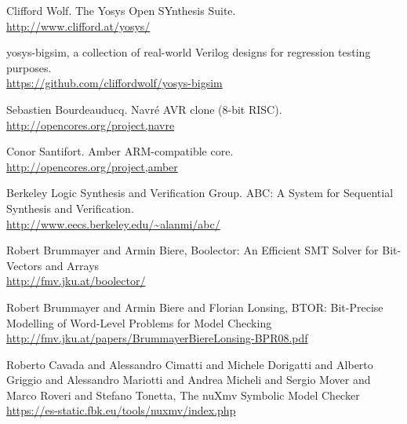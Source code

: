 \documentclass[9pt,technote,a4paper]{IEEEtran}
\begin{document}
\begin{thebibliography}{9}

Clifford Wolf. The Yosys Open SYnthesis Suite. \\
\url{http://www.clifford.at/yosys/}

yosys-bigsim, a collection of real-world Verilog designs for regression testing purposes. \\
\url{https://github.com/cliffordwolf/yosys-bigsim}

Sebastien Bourdeauducq. Navré AVR clone (8-bit RISC). \\
\url{http://opencores.org/project,navre}

Conor Santifort. Amber ARM-compatible core. \\
\url{http://opencores.org/project,amber}

Berkeley Logic Synthesis and Verification Group. ABC: A System for Sequential Synthesis and Verification. \\
\url{http://www.eecs.berkeley.edu/~alanmi/abc/}

Robert Brummayer and Armin Biere, Boolector: An Efficient SMT Solver for Bit-Vectors and Arrays\\
\url{http://fmv.jku.at/boolector/}

Robert Brummayer and Armin Biere and Florian Lonsing, BTOR:
Bit-Precise Modelling of Word-Level Problems for Model Checking\\
\url{http://fmv.jku.at/papers/BrummayerBiereLonsing-BPR08.pdf}

Roberto Cavada and Alessandro Cimatti and Michele Dorigatti and
Alberto Griggio and Alessandro Mariotti and Andrea Micheli and Sergio
Mover and Marco Roveri and Stefano Tonetta, The nuXmv Symbolic Model
Checker\\
\url{https://es-static.fbk.eu/tools/nuxmv/index.php}

\end{thebibliography}
\end{document}
